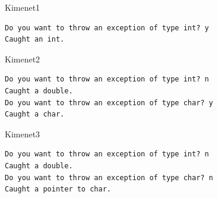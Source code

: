\documentclass[usenames,dvipsnames,aspectratio=169]{beamer}
\begin{document}
\begin{frame}
    \begin{exampleblock}{}
        \footnotesize
        
    \end{exampleblock}
\end{frame}

\begin{frame}
    \begin{exampleblock}{}
        \vspace{-.2cm}
        
        \vspace{-.2cm}
    \end{exampleblock}
\end{frame}

\begin{frame}[fragile]
    \begin{block}{Kimenet1}
        \vspace{-.45cm}
        \small
        \begin{verbatim}
Do you want to throw an exception of type int? y
Caught an int.
\end{verbatim}
    \vspace{-.45cm}
    \end{block}
    \begin{block}{Kimenet2}
        \vspace{-.45cm}
        \small
        \begin{verbatim}
Do you want to throw an exception of type int? n
Caught a double.
Do you want to throw an exception of type char? y
Caught a char.
\end{verbatim}
    \vspace{-.45cm}
    \end{block}
    \begin{block}{Kimenet3}
        \vspace{-.45cm}
        \small
        \begin{verbatim}
Do you want to throw an exception of type int? n
Caught a double.
Do you want to throw an exception of type char? n
Caught a pointer to char.
\end{verbatim}
    \vspace{-.45cm}
    \end{block}
\end{frame}
\end{document}
